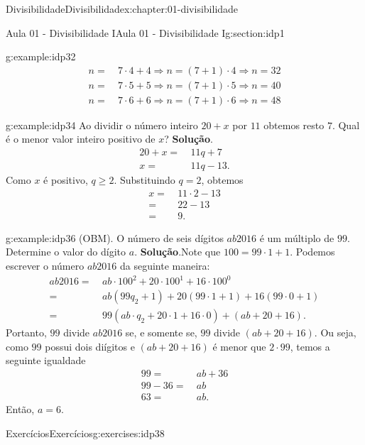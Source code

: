 \documentclass[oneside,10pt,]{book}
\newcommand{\blocktitlefont}{\relax}
\numberwithin{equation}{section}
\newcommand{\amp}{&}
\begin{document}
\begin{chapterptx}{Divisibilidade}{}{Divisibilidade}{}{}{x:chapter:01-divisibilidade}
\begin{sectionptx}{Aula 01 - Divisibilidade I}{}{Aula 01 - Divisibilidade I}{}{}{g:section:idp1}
\begin{example}{}{g:example:idp32}
\begin{align*}
n =\amp~ 7\cdot 4+4 \Rightarrow n= (7+1)\cdot 4\Rightarrow n=32\\
n =\amp~ 7\cdot 5+5 \Rightarrow n= (7+1)\cdot 5\Rightarrow n=40\\
n =\amp~ 7\cdot 6+6 \Rightarrow n= (7+1)\cdot 6\Rightarrow n=48
\end{align*}
%
\end{example}
\begin{example}{}{g:example:idp34}%
Ao dividir o número inteiro \(20+x\) por \(11\) obtemos resto \(7\). Qual é o menor valor inteiro positivo de \(x\)?%
\textbf{\blocktitlefont Solução}.\hypertarget{g:solution:idp35}{}\quad{}%
\begin{align*}
20+x =\amp~ 11q+7\\
x=\amp~11q-13.
\end{align*}
Como \(x\) é positivo, \(q\geq 2\). Substituindo \(q=2\), obtemos%
\begin{align*}
x =\amp~ 11\cdot 2-13\\
=\amp~22-13\\
=\amp~9.
\end{align*}
%
\end{example}
\begin{example}{}{g:example:idp36}%
(OBM). O número de seis dígitos \(ab2016\) é um múltiplo de \(99\). Determine o valor do dígito \(a\).%
\textbf{\blocktitlefont Solução}.\hypertarget{g:solution:idp37}{}\quad{}Note que \(100 = 99\cdot 1 + 1\). Podemos escrever o número \(ab2016\) da seguinte maneira:%
\begin{align*}
ab2016 =\amp~ ab\cdot 100^2+ 20\cdot 100^1 + 16\cdot 100^0\\
=\amp~ab(99q_2+1)+20(99\cdot 1+1)+16(99\cdot 0+1)\\
=\amp~99(ab\cdot q_2+20\cdot 1+16\cdot 0) + (ab+20+16).
\end{align*}
Portanto, \(99\) divide \(ab2016\) se, e somente se, \(99\) divide \((ab+20+16)\). Ou seja, como \(99\) possui dois diígitos e \((ab+20+16)\) é menor que \(2\cdot 99\), temos a seguinte igualdade%
\begin{align*}
99 =\amp~ ab+36\\
99-36=\amp~ab\\
63=\amp~ab.
\end{align*}
Então, \(a=6\).%
\end{example}
%
%
\typeout{************************************************}
\typeout{************************************************}
%
\begin{exercises-subsection}{Exercícios}{}{Exercícios}{}{}{g:exercises:idp38}

\end{exercises-subsection}
\end{sectionptx}
\end{chapterptx}
\end{document}
